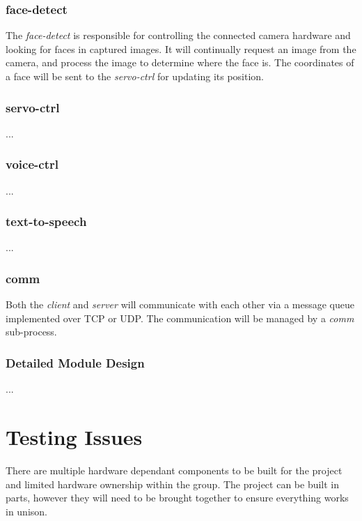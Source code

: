 \documentclass[11pt,a4paper,titlepage]{report}
\begin{document}
\subsubsection{face-detect}

The \textit{face-detect} is responsible for controlling the connected camera hardware and looking for faces in captured images. It will continually request an image from the camera, and process the image to determine where the face is. The coordinates of a face will be sent to the \textit{servo-ctrl} for updating its position.


\subsubsection{servo-ctrl}


...



\subsubsection{voice-ctrl}

...



\subsubsection{text-to-speech}

...


\subsubsection{comm}

Both the \textit{client} and \textit{server} will communicate with each other via a message queue implemented over TCP or UDP. The communication will be managed by a \textit{comm} sub-process.




\subsubsection{Detailed Module Design}

...


\section{Testing Issues}

There are multiple hardware dependant components to be built for the project and limited hardware ownership within the group. The project can be built in parts, however they will need to be brought together to ensure everything works in unison. 
\end{document}
